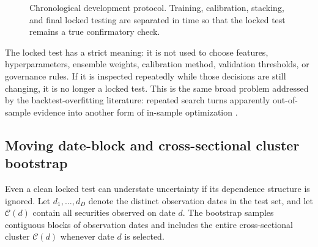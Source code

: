 \documentclass[11pt]{article}
\begin{document}
\begin{figure}[tbp]
\centering
{}
\caption{Chronological development protocol. Training, calibration, stacking, and final locked testing are separated in time so that the locked test remains a true confirmatory check.}
\label{fig:timeline}
\end{figure}

The locked test has a strict meaning: it is not used to choose features, hyperparameters, ensemble weights, calibration method, validation thresholds, or governance rules. If it is inspected repeatedly while those decisions are still changing, it is no longer a locked test. This is the same broad problem addressed by the backtest-overfitting literature: repeated search turns apparently out-of-sample evidence into another form of in-sample optimization \citep{bailey2017pbo}.

\subsection{Moving date-block and cross-sectional cluster bootstrap}

Even a clean locked test can understate uncertainty if its dependence structure is ignored. Let $d_1,\ldots,d_D$ denote the distinct observation dates in the test set, and let $\mathcal C(d)$ contain all securities observed on date $d$. The bootstrap samples contiguous blocks of observation dates and includes the entire cross-sectional cluster $\mathcal C(d)$ whenever date $d$ is selected.
\end{document}

